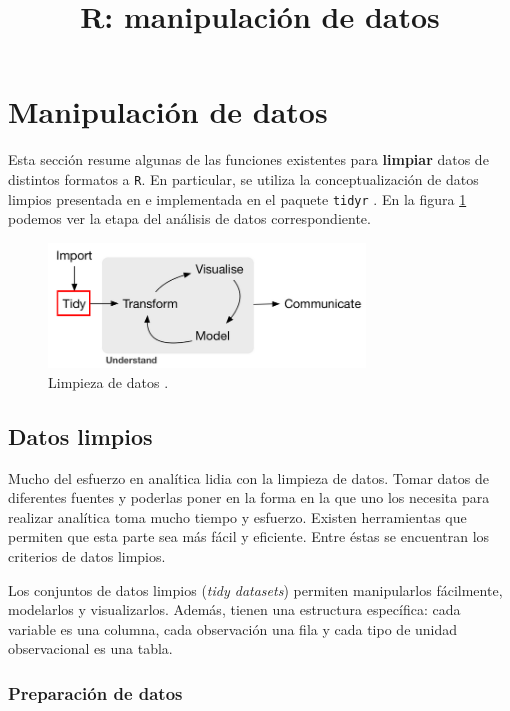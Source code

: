 \documentclass[]{article}
\title{R: manipulación de datos}
\author{}
\date{}
\begin{document}
\section{Manipulación de datos}\label{manipulacion-de-datos}

Esta sección resume algunas de las funciones existentes para
\textbf{limpiar} datos de distintos formatos a \texttt{R}. En
particular, se utiliza la conceptualización de datos limpios presentada
en \textcite{wickham2014tidy} e implementada en el paquete
\texttt{tidyr} \parencite{tidyr}. En la figura \ref{fig:ciclo2} podemos
ver la etapa del análisis de datos correspondiente.

\begin{figure}[h]
    \centering
    \includegraphics[width=0.75\textwidth]{../img/02_ciclo_2.png}
    \caption{Limpieza de datos \textcite[Introducción]{grolemund2016r}.}
    \label{fig:ciclo2}
\end{figure}

\subsection{Datos limpios}\label{datos-limpios}

Mucho del esfuerzo en analítica lidia con la limpieza de datos. Tomar
datos de diferentes fuentes y poderlas poner en la forma en la que uno
los necesita para realizar analítica toma mucho tiempo y esfuerzo.
Existen herramientas que permiten que esta parte sea más fácil y
eficiente. Entre éstas se encuentran los criterios de datos limpios.

Los conjuntos de datos limpios (\emph{tidy datasets}) permiten
manipularlos fácilmente, modelarlos y visualizarlos. Además, tienen una
estructura específica: cada variable es una columna, cada observación
una fila y cada tipo de unidad observacional es una tabla.

\subsubsection{Preparación de datos}\label{preparacion-de-datos}
\end{document}

